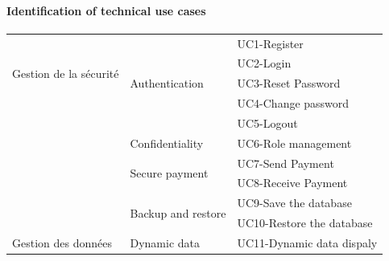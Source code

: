 \paragraph{Identification of technical use cases}

\begin{longtable}{|m{10em}|m{10em}|m{10em}|}\hline
      \multirow{4}{*}{Gestion de la sécurité} & \multirow{5}{*}{Authentication}          & UC1-Register                                                    \\\cline{3-3}
                                              &                                          & UC2-Login                                                       \\\cline{3-3}
                                              &                                          & UC3-Reset Password                                              \\\cline{3-3}
                                              &                                          & UC4-Change password                                             \\\cline{3-3}
                                              &                                          & UC5-Logout                                                      \\\cline{2-3}
                                              & \multirow{1}{*}{Confidentiality}         & UC6-Role management                                             \\\cline{2-3}
                                              & \multirow{2}{*}{Secure payment}          & UC7-Send Payment                                                \\\cline{3-3}
                                              &                                          & UC8-Receive Payment                                             \\\cline{2-3}
                                              & \multirow{2}{*}{Backup and restore}      & UC9-Save the database                                           \\\cline{3-3}
                                              &                                          & UC10-Restore the database                                       \\\hline
      \multirow{7}{*}{Gestion des données}    & \multirow{1}{*}{Dynamic data}            & UC11-Dynamic data dispaly                                       \\\cline{2-3}

\end{longtable}
